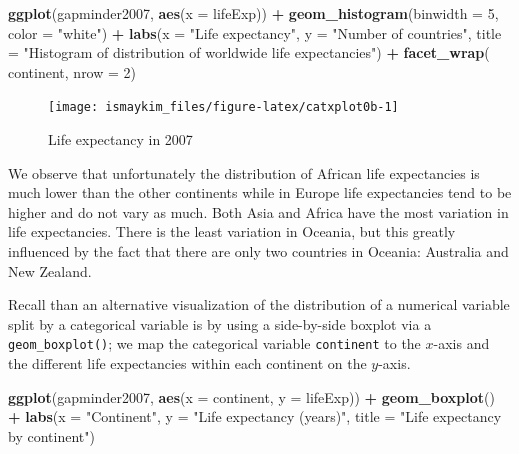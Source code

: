 \documentclass[12pt, krantz2,]{krantz}
\makeatletter
\newenvironment{Shaded}{\begin{snugshade}}{\end{snugshade}}
\newcommand{\DataTypeTok}[1]{\textcolor[rgb]{0.27,0.27,0.27}{#1}}
\newcommand{\DecValTok}[1]{\textcolor[rgb]{0.06,0.06,0.06}{#1}}
\newcommand{\KeywordTok}[1]{\textcolor[rgb]{0.27,0.27,0.27}{\textbf{#1}}}
\newcommand{\NormalTok}[1]{#1}
\newcommand{\OperatorTok}[1]{\textcolor[rgb]{0.43,0.43,0.43}{\textbf{#1}}}
\newcommand{\StringTok}[1]{\textcolor[rgb]{0.5,0.5,0.5}{#1}}
\newenvironment{kframe}{%
\medskip{}
\setlength{\fboxsep}{.8em}
 \def\at@end@of@kframe{}%
 \ifinner\ifhmode%
  \def\at@end@of@kframe{\end{minipage}}%
  \begin{minipage}{\columnwidth}%
 \fi\fi%
 \def\FrameCommand##1{\hskip\@totalleftmargin \hskip-\fboxsep
 \colorbox{shadecolor}{##1}\hskip-\fboxsep
     \hskip-\linewidth \hskip-\@totalleftmargin \hskip\columnwidth}%
 \MakeFramed {\advance\hsize-\width
   \@totalleftmargin\z@ \linewidth\hsize
   \@setminipage}}%
 {\par\unskip\endMakeFramed%
 \at@end@of@kframe}
\renewenvironment{Shaded}{\begin{kframe}}{\end{kframe}}
\makeatother
\begin{document}
\begin{Shaded}
\begin{Highlighting}[]
\KeywordTok{ggplot}\NormalTok{(gapminder2007, }\KeywordTok{aes}\NormalTok{(}\DataTypeTok{x =}\NormalTok{ lifeExp)) }\OperatorTok{+}
\StringTok{  }\KeywordTok{geom_histogram}\NormalTok{(}\DataTypeTok{binwidth =} \DecValTok{5}\NormalTok{, }\DataTypeTok{color =} \StringTok{"white"}\NormalTok{) }\OperatorTok{+}
\StringTok{  }\KeywordTok{labs}\NormalTok{(}\DataTypeTok{x =} \StringTok{"Life expectancy"}\NormalTok{, }\DataTypeTok{y =} \StringTok{"Number of countries"}\NormalTok{,}
       \DataTypeTok{title =} \StringTok{"Histogram of distribution of worldwide life expectancies"}\NormalTok{) }\OperatorTok{+}
\StringTok{  }\KeywordTok{facet_wrap}\NormalTok{(}\OperatorTok{~}\StringTok{ }\NormalTok{continent, }\DataTypeTok{nrow =} \DecValTok{2}\NormalTok{)}
\end{Highlighting}
\end{Shaded}

\begin{figure}

{\centering \texttt{[image: ismaykim\_files/figure-latex/catxplot0b-1]} 

}

\caption{Life expectancy in 2007}\label{fig:catxplot0b}
\end{figure}

We observe that unfortunately the distribution of African life expectancies is much lower than the other continents while in Europe life expectancies tend to be higher and do not vary as much. Both Asia and Africa have the most variation in life expectancies. There is the least variation in Oceania, but this greatly influenced by the fact that there are only two countries in Oceania: Australia and New Zealand.

Recall than an alternative visualization of the distribution of a numerical variable split by a categorical variable is by using a side-by-side boxplot via a \texttt{geom\_boxplot()}; we map the categorical variable \texttt{continent} to the \(x\)-axis and the different life expectancies within each continent on the \(y\)-axis.

\begin{Shaded}
\begin{Highlighting}[]
\KeywordTok{ggplot}\NormalTok{(gapminder2007, }\KeywordTok{aes}\NormalTok{(}\DataTypeTok{x =}\NormalTok{ continent, }\DataTypeTok{y =}\NormalTok{ lifeExp)) }\OperatorTok{+}
\StringTok{  }\KeywordTok{geom_boxplot}\NormalTok{() }\OperatorTok{+}
\StringTok{  }\KeywordTok{labs}\NormalTok{(}\DataTypeTok{x =} \StringTok{"Continent"}\NormalTok{, }\DataTypeTok{y =} \StringTok{"Life expectancy (years)"}\NormalTok{,}
       \DataTypeTok{title =} \StringTok{"Life expectancy by continent"}\NormalTok{)}
\end{Highlighting}
\end{Shaded}
\end{document}
